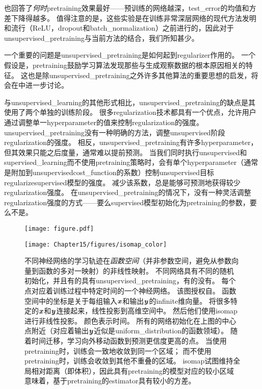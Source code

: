 \cite{Erhan+al-2010-small}也回答了\emph{何时}\gls{pretraining}效果最好——预训练的网络越深，\gls{test_error}的均值和方差下降得越多。
值得注意的是，这些实验是在训练非常深层网络的现代方法发明和流行（\gls{ReLU}，\gls{dropout}和\gls{batch_normalization}）之前进行的，因此对于\gls{unsupervised_pretraining}与当前方法的结合，我们所知甚少。

一个重要的问题是\gls{unsupervised_pretraining}是如何起到\gls{regularizer}作用的。
一个假设是，\gls{pretraining}鼓励学习算法发现那些与生成观察数据的根本原因相关的特征。
这也是除\gls{unsupervised_pretraining}之外许多其他算法的重要思想的启发，将会在中进一步讨论。

与\gls{unsupervised_learning}的其他形式相比，\gls{unsupervised_pretraining}的缺点是其使用了两个单独的训练阶段。
很多\gls{regularization}技术都具有一个优点，允许用户通过调整单一\gls{hyperparameter}的值来控制\gls{regularization}的强度。
\gls{unsupervised_pretraining}没有一种明确的方法，调整\gls{unsupervised}阶段\gls{regularization}的强度。
相反，\gls{unsupervised_pretraining}有许多\gls{hyperparameter}，但其效果只能之后度量，通常难以提前预测。
当我们同时执行\gls{unsupervised}和\gls{supervised_learning}而不使用\gls{pretraining}策略时，会有单个\gls{hyperparameter}（通常是附加到\gls{unsupervised}\gls{cost_function}的系数）控制\gls{unsupervised}目标\gls{regularize}\gls{supervised}模型的强度。
减少该系数，总是能够可预测地获得较少\gls{regularization}强度。
在\gls{unsupervised_pretraining}的情况下，没有一种灵活调整\gls{regularization}强度的方式——要么\gls{supervised}模型初始化为\gls{pretraining}的参数，要么不是。


\begin{figure}[!htb]
\ifOpenSource
\centerline{\texttt{[image: figure.pdf]}}
\else
\centerline{\texttt{[image: Chapter15/figures/isomap\_color]}}
\fi
\caption{不同神经网络的学习轨迹在\emph{函数空间}（并非参数空间，避免从参数向量到函数的多对一映射）的非线性映射。
不同网络具有不同的随机初始化，并且有的具有\gls{unsupervised_pretraining}，有的没有。
每个点对应着训练过程中特定时间的一个神经网络。
该图授权自\cite{Erhan+al-2010-small}。
函数空间中的坐标是关于每组输入$\boldsymbol{\mathit{x}}$和输出$\boldsymbol{\mathit{y}}$的\gls{infinite}维向量。
\cite{Erhan+al-2010-small}将很多特定的$\boldsymbol{\mathit{x}}$和$\boldsymbol{\mathit{y}}$连接起来，线性投影到高维空间中。
然后他们使用\gls{isomap}\citep{Tenenbaum2000-isomap}进行非线性投影。
颜色表示时间。
所有的网络初始化在上图的中心点附近（对应着输出$\boldsymbol{\mathit{y}}$近似是\gls{uniform_distribution}的函数领域）。
随着时间迁移，学习向外移动函数到预测更信度更高的点。
当使用\gls{pretraining}时，训练会一致地收敛到同一个区域；
而不使用\gls{pretraining}时，训练会收敛到其他不重叠的区域。
\gls{isomap}试图维持全局相对距离（即体积），因此具有\gls{pretraining}的模型对应的较小区域意味着，基于\gls{pretraining}的\gls{estimator}具有较小的方差。
}
\label{fig:chap15_isomap}
\end{figure}


